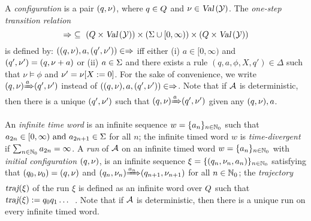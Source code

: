 \smallskip{}
A \emph{configuration} is a pair $(q,\nu)$, where $q\in Q$ and $\nu\in\mbox{\sl Val}\left(\mathcal{Y}\right)$.
The \emph{one-step transition relation}
\[
\Rightarrow~\subseteq~ (Q \times \mbox{\sl Val}\left(\mathcal{Y}\right)) \times (\Sigma\cup [0,\infty)) \times (Q \times \mbox{\sl Val}\left(\mathcal{Y}\right))
\]
is defined by: $((q,\nu),a,(q',\nu'))\in\Rightarrow$ iff
either (i) $a\in [0,\infty)$ and $(q',\nu')=(q,\nu+a)$
or (ii) $a\in\Sigma$ and there exists a rule $(q,a,\phi,X,q')\in\Delta$
such that $\nu\models\phi$ and $\nu'={\nu}{\left[X:=0\right]}$.
For the sake of convenience, we write ${(q,\nu)}{\xRightarrow{a}}{(q',\nu')}$
instead of $((q,\nu),a,(q',\nu'))\in\Rightarrow$.
Note that if $\mathcal{A}$ is deterministic, then there is a unique $(q',\nu')$ such that
${(q,\nu)}{\xRightarrow{a}}{(q',\nu')}$ given any $(q,\nu), a$.



\smallskip
{}
An \emph{infinite time word} is an infinite sequence $w=\{a_n\}_{n\in\mathbb{N}_0}$ such that
$
    a_{2n}      \in [0,\infty)
    \mbox{ and }
    a_{2n+1}    \in \Sigma
$
for all $n$;
the infinite timed word $w$ is \emph{time-divergent} if $\sum_{n\in\mathbb{N}_0}a_{2n}=\infty$.
A \emph{run} of $\mathcal{A}$ on an infinite timed word $w=\{a_n\}_{n\in\mathbb{N}_0}$
with \emph{initial configuration} $(q,\nu)$,
is an infinite
sequence $\xi=\{\left(q_n,\nu_n,a_n\right)\}_{n\in\mathbb{N}_0}$
satisfying that $(q_0,\nu_0)=(q,\nu)$ and ${(q_n,\nu_n)}{\xRightarrow{a_n}}{(q_{n+1},\nu_{n+1})}$
for all $n\in\mathbb{N}_0$;
the \emph{trajectory}
$\mbox{\sl traj} (  \xi  )$
of the run
$\xi$
is defined as an infinite word over $Q$ such that
$\mbox{\sl traj} (  \xi  ) := q_0 q_1 \dots$~.
Note that if $\mathcal{A}$ is deterministic, then there is a unique run on every infinite timed word.

